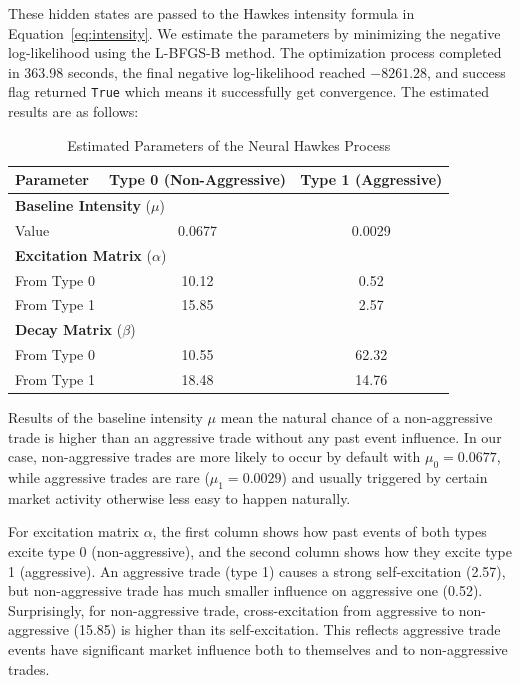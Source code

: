 These hidden states are passed to the Hawkes intensity formula in Equation~\ref{eq:intensity}. We estimate the parameters by minimizing the negative log-likelihood using the L-BFGS-B method. The optimization process completed in 363.98 seconds, the final negative log-likelihood reached $-8261.28$, and success flag returned \texttt{True} which means it successfully get convergence. The estimated results are as follows:
\begin{table}[H]
    \centering
    \caption{Estimated Parameters of the Neural Hawkes Process}
    \label{tb:hawkes-params}
    \begin{tabular}{lcc}
    \toprule
    \textbf{Parameter} & \textbf{Type 0 (Non-Aggressive)} & \textbf{Type 1 (Aggressive)} \\
    \midrule
    \multicolumn{3}{l}{\textbf{Baseline Intensity} (\( \mu \))} \\
    \quad Value & 0.0677 & 0.0029 \\
    \midrule
    \multicolumn{3}{l}{\textbf{Excitation Matrix} (\( \alpha \))} \\
    \quad From Type 0 & 10.12 & 0.52 \\
    \quad From Type 1 & 15.85 & 2.57 \\
    \midrule
    \multicolumn{3}{l}{\textbf{Decay Matrix} (\( \beta \))} \\
    \quad From Type 0 & 10.55 & 62.32 \\
    \quad From Type 1 & 18.48 & 14.76 \\
    \bottomrule
    \end{tabular}
\end{table}

Results of the baseline intensity $\mu$ mean the natural chance of a non-aggressive trade is higher than an aggressive trade without any past event influence. In our case, non-aggressive trades are more likely to occur by default with $\mu_0 = 0.0677$, while aggressive trades are rare ($\mu_1 = 0.0029$) and usually triggered by certain market activity otherwise less easy to happen naturally.

For excitation matrix $\alpha$, the first column shows how past events of both types excite type 0 (non-aggressive), and the second column shows how they excite type 1 (aggressive). An aggressive trade (type 1) causes a strong self-excitation (2.57), but non-aggressive trade has much smaller influence on aggressive one (0.52). Surprisingly, for non-aggressive trade, cross-excitation from aggressive to non-aggressive (15.85) is higher than its self-excitation. This reflects aggressive trade events have significant market influence both to themselves and to non-aggressive trades.

